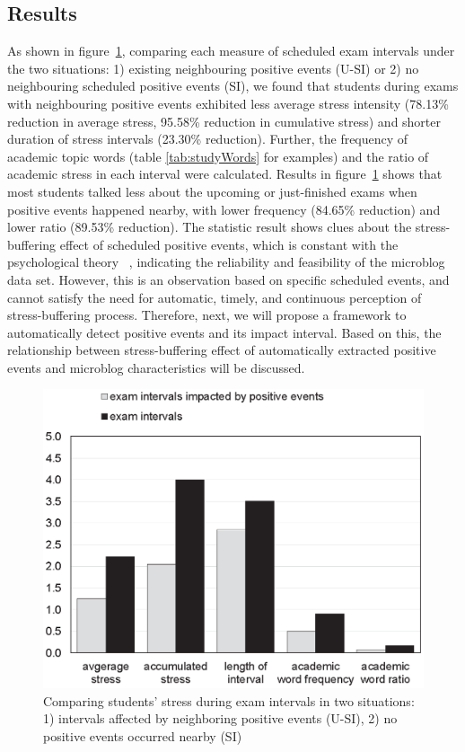 \subsection{Results}
As shown in figure~\ref{fig:frequency},
comparing each measure of scheduled exam intervals under the two situations:
1) existing neighbouring positive events (U-SI) or 2) no neighbouring scheduled positive events (SI),
we found that students during exams with neighbouring positive events exhibited less average stress intensity
(78.13\% reduction in average stress, 95.58\%  reduction in cumulative stress)
and shorter duration of stress intervals (23.30\% reduction).
Further, the frequency of academic topic words (table \ref{tab:studyWords} for examples)
and the ratio of academic stress in each interval were calculated.
Results in figure~\ref{fig:frequency} shows that most students talked less about the upcoming or just-finished exams when positive events happened nearby,
with lower frequency (84.65\% reduction) and lower ratio (89.53\% reduction). 
The statistic result shows clues about the stress-buffering effect of scheduled positive events,
which is constant with the psychological theory ~\citep{Cohen1984Positive, Cohen2010Positive, Needles1990Positive},
indicating the reliability and feasibility of the microblog data set.
However,
this is an observation based on specific scheduled events,
and cannot satisfy the need for automatic, timely, and continuous perception of stress-buffering process.
Therefore, next, we will propose a framework to automatically detect positive events and its impact interval.
Based on this,
the relationship between stress-buffering effect of automatically extracted positive events and
microblog characteristics will be discussed.

\begin{figure}[h]
\centering
\includegraphics[width=0.8\linewidth]{figs/obnew-color.eps}
\caption{\small{Comparing students' stress during exam intervals in two situations:
1) intervals affected by neighboring positive events (U-SI), 2) no positive events occurred nearby (SI)}}
\label{fig:frequency}
\end{figure}
